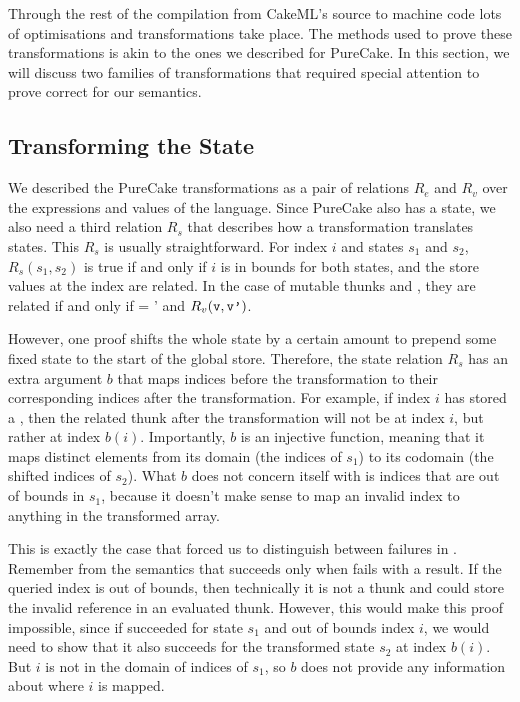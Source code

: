 Through the rest of the compilation from CakeML's source to machine code lots of
optimisations and transformations take place. The methods used to prove these
transformations is akin to the ones we described for PureCake. In this section,
we will discuss two families of transformations that required special attention
to prove correct for our semantics.

\subsection{Transforming the State}

We described the PureCake transformations as a pair of relations $R_e$ and $R_v$
over the expressions and values of the language. Since PureCake also has a
state, we also need a third relation $R_s$ that describes how a transformation
translates states. This $R_s$ is usually straightforward. For index $i$ and
states $s_1$ and $s_2$, $R_s(s_1,s_2)$ is true if and only if $i$ is in bounds
for both states, and the store values at the index are related. In the case of
mutable thunks   and  , they are
related if and only if  = ' and $R_v(\texttt{v},\texttt{v'})$.

However, one proof shifts the whole state by a certain amount to prepend some
fixed state to the start of the global store. Therefore, the state relation
$R_s$ has an extra argument $b$ that maps indices before the transformation to
their corresponding indices after the transformation. For example, if index $i$
has stored a  , then the related thunk after the
transformation will not be at index $i$, but rather at index $b(i)$.
Importantly, $b$ is an injective function, meaning that it maps distinct
elements from its domain (the indices of $s_1$) to its codomain (the shifted
indices of $s_2$). What $b$ does not concern itself with is indices that are out
of bounds in $s_1$, because it doesn't make sense to map an invalid index to
anything in the transformed array.

This is exactly the case that forced us to distinguish between failures in
. Remember from the semantics that 
succeeds only when  fails with a  result. If
the queried index is out of bounds, then technically it is not a thunk and
 could store the invalid reference in an evaluated thunk.
However, this would make this proof impossible, since if 
succeeded for state $s_1$ and out of bounds index $i$, we would need to show
that it also succeeds for the transformed state $s_2$ at index $b(i)$. But $i$
is not in the domain of indices of $s_1$, so $b$ does not provide any
information about where $i$ is mapped.

